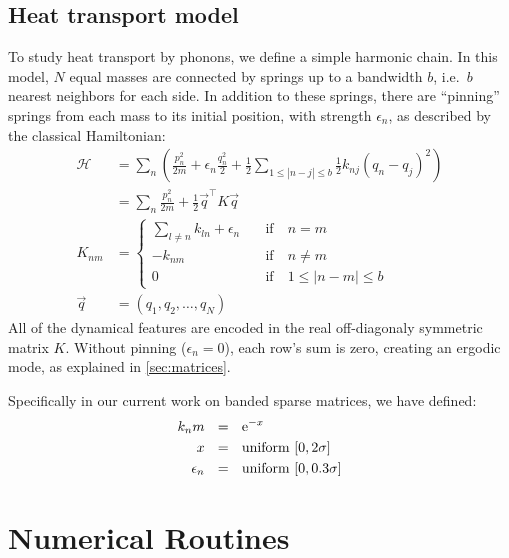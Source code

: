 \section{Heat transport model}\label{sec:app_heat}

To study heat transport by phonons, we define a simple harmonic chain.
In this model, $N$ equal masses are connected by springs 
up to a bandwidth $b$, i.e.\ $b$ nearest neighbors for each side. 
In addition to these springs, there are ``pinning'' springs from each
mass to its initial position, with
strength $\epsilon_n$, as described by the classical Hamiltonian:
%
\begin{align}
\mathcal{H} &= \sum_n \left( \frac{p_n^2}{2m} +\epsilon_n\frac{q_n^2}{2}+ \frac{1}{2}\sum_{1\le |n-j|\le b} \frac{1}{2}k_{nj} (q_n-q_j)^2 \right) \\
            &= \sum_{n} \frac{p_n^2}{2m} +  \frac{1}{2}\vec{q}^{\intercal} K \vec{q} \\
            K_{nm} &= \begin{cases} 
            \sum_{l\ne n} k_{ln} +\epsilon_n \quad &\textrm{if}\quad n=m \label{eq:K_matrix}\\ 
            - k_{nm}  \quad &\textrm{if}\quad n\ne m \\
            0 \quad &\textrm{if}\quad 1\le |n-m|\le b
            \end{cases}\\
            \vec{q} &= (q_1,q_2,\ldots,q_N)
\end{align}
%
All of the dynamical features are encoded in the real off-diagonaly symmetric matrix $K$.
Without pinning ($\epsilon_n=0$), each row's sum is zero,
creating an ergodic mode, as explained in \autoref{sec:matrices}.


Specifically in our current work on banded sparse matrices, we have defined:
\begin{align}
k_nm \ \ &=\ \ \mbox{e}^{-x} \\
x\ \ &= \ \ \textrm{uniform } [0,2\sigma]\\
\epsilon_n \ \ &= \ \ \textrm{uniform } [0,0.3\sigma]
\end{align}




\chapter{Numerical Routines}


